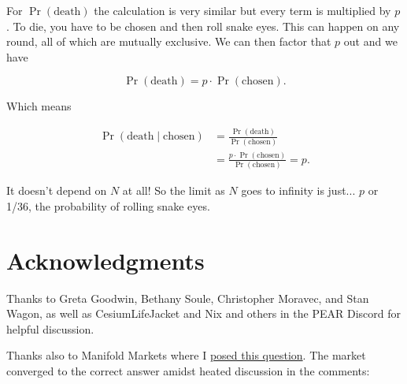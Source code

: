 \documentclass[article,twocolumn]{memoir}
\begin{document}

For $\Pr(\text{death})$ the calculation is very similar but every term is multiplied by $p$.
To die, you have to be chosen and then roll snake eyes.
This can happen on any round, all of which are mutually exclusive.
We can then factor that $p$ out and we have

$$
\Pr(\text{death}) = p\cdot\Pr(\text{chosen}).
$$

Which means

\begin{equation*}
\begin{split}
\Pr(\text{death} \mid \text{chosen}) & = 
\frac{\Pr(\text{death})}{\Pr(\text{chosen})} \\
& = \frac{p\cdot\Pr(\text{chosen})}{\Pr(\text{chosen})} = 
p.
\end{split}
\end{equation*}

It doesn't depend on $N$ at all!
So the limit as $N$ goes to infinity is just... 
$p$ or 1/36, the probability of rolling snake eyes.
\qedsymbol{}


\chapter*{Acknowledgments}

Thanks to 
Greta Goodwin, 
Bethany Soule, 
Christopher Moravec,
and Stan Wagon, as well as
CesiumLifeJacket and Nix and others in the PEAR Discord for helpful discussion.

Thanks also to Manifold Markets where I 
\href{https://manifold.markets/dreev/is-the-probability-of-dying-in-the}{posed this question}.
The market converged to the correct answer amidst heated discussion in the comments:
\end{document}
